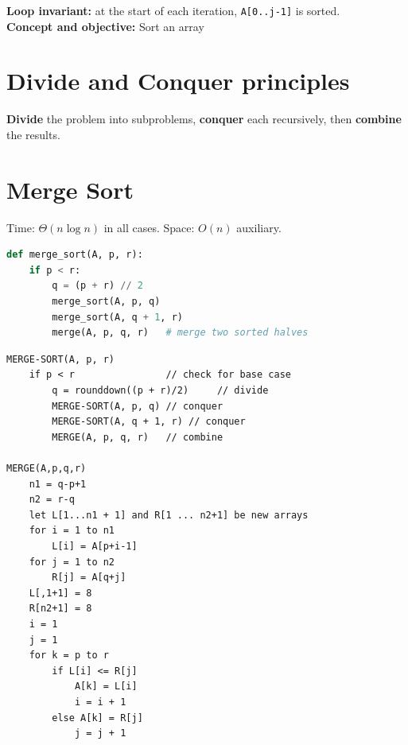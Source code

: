 \documentclass[11pt,a4paper,openany]{book}
\begin{document}
\textbf{Loop invariant:} at the start of each iteration, \texttt{A[0..j-1]} is sorted. \\
\textbf{Concept and objective:} Sort an array








\vspace{2cm}





\section{Divide and Conquer principles}

\begin{defnbox}[title=Paradigm]
\textbf{Divide} the problem into subproblems, \textbf{conquer} each recursively, then
\textbf{combine} the results.
\end{defnbox}










\vspace{2cm}









\section{Merge Sort}

\begin{propbox}[title=Complexity]
Time: $\Theta(n \log n)$ in all cases. \quad Space: $O(n)$ auxiliary.
\end{propbox}

\begin{lstlisting}[language=Python]
def merge_sort(A, p, r):
    if p < r:
        q = (p + r) // 2
        merge_sort(A, p, q)
        merge_sort(A, q + 1, r)
        merge(A, p, q, r)   # merge two sorted halves
\end{lstlisting}

\begin{lstlisting}
MERGE-SORT(A, p, r)
    if p < r                // check for base case
        q = rounddown((p + r)/2)     // divide
        MERGE-SORT(A, p, q) // conquer
        MERGE-SORT(A, q + 1, r) // conquer
        MERGE(A, p, q, r)   // combine

MERGE(A,p,q,r)
	n1 = q-p+1
	n2 = r-q
	let L[1...n1 + 1] and R[1 ... n2+1] be new arrays
	for i = 1 to n1
		L[i] = A[p+i-1]
	for j = 1 to n2
		R[j] = A[q+j]
	L[,1+1] = 8
	R[n2+1] = 8
	i = 1
	j = 1
	for k = p to r
		if L[i] <= R[j]
			A[k] = L[i]
			i = i + 1
		else A[k] = R[j]
			j = j + 1
\end{lstlisting}
\end{document}
